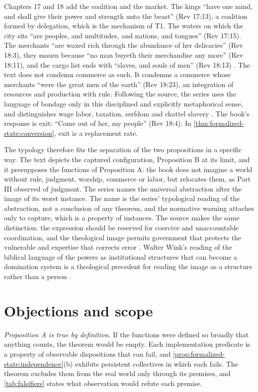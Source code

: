 \documentclass[11pt,letterpaper]{article}
\theoremstyle{definition}
\theoremstyle{remark}
\begin{document}
Chapters 17 and 18 add the coalition and the market. The kings ``have one mind, and shall give their power and strength unto the beast'' (Rev 17:13), a coalition formed by delegation, which is the mechanism of T1. The waters on which the city sits ``are peoples, and multitudes, and nations, and tongues'' (Rev 17:15). The merchants ``are waxed rich through the abundance of her delicacies'' (Rev 18:3), they mourn because ``no man buyeth their merchandise any more'' (Rev 18:11), and the cargo list ends with ``slaves, and souls of men'' (Rev 18:13) \citep{kjv}. The text does not condemn commerce as such. It condemns a commerce whose merchants ``were the great men of the earth'' (Rev 18:23), an integration of resources and production with rule. Following the source, the series uses the language of bondage only in this disciplined and explicitly metaphorical sense, and distinguishes wage labor, taxation, serfdom and chattel slavery \citep{largo2026hbs}. The book's response is exit: ``Come out of her, my people'' (Rev 18:4). In \cref{thm:formalized-state:conversion}, exit is a replacement rate.

The typology therefore fits the separation of the two propositions in a specific way. The text depicts the captured configuration, Proposition B at its limit, and it presupposes the functions of Proposition A: the book does not imagine a world without rule, judgment, worship, commerce or labor, but relocates them, as Part III observed of judgment. The series names the universal abstraction after the image of its worst instance. The name is the series' typological reading of the abstraction, not a conclusion of any theorem, and the normative warning attaches only to capture, which is a property of instances. The source makes the same distinction: the expression should be reserved for coercive and unaccountable coordination, and the theological image permits government that protects the vulnerable and expertise that corrects error \citep{largo2026hbs}. Walter Wink's reading of the biblical language of the powers as institutional structures that can become a domination system is a theological precedent for reading the image as a structure rather than a person \citep{wink1992}.

\section{Objections and scope}
\label{sec:objections}

\emph{Proposition A is true by definition.} If the functions were defined so broadly that anything counts, the theorem would be empty. Each implementation predicate is a property of observable dispositions that can fail, and \cref{prop:formalized-state:independence}(b) exhibits persistent collectives in which each fails. The theorem excludes them from the real world only through its premises, and \cref{tab:falsifiers} states what observation would refute each premise.
\end{document}
